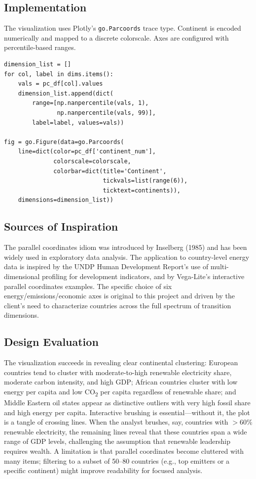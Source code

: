 \documentclass[10pt]{article}
\begin{document}
\subsection{Implementation}

The visualization uses Plotly's \texttt{go.Parcoords} trace type. Continent is encoded numerically and mapped to a discrete colorscale. Axes are configured with percentile-based ranges.

\begin{lstlisting}[caption={Parallel coordinates construction (simplified)},label=lst:parcoords]
dimension_list = []
for col, label in dims.items():
    vals = pc_df[col].values
    dimension_list.append(dict(
        range=[np.nanpercentile(vals, 1),
               np.nanpercentile(vals, 99)],
        label=label, values=vals))

fig = go.Figure(data=go.Parcoords(
    line=dict(color=pc_df['continent_num'],
              colorscale=colorscale,
              colorbar=dict(title='Continent',
                            tickvals=list(range(6)),
                            ticktext=continents)),
    dimensions=dimension_list))
\end{lstlisting}

\subsection{Sources of Inspiration}

The parallel coordinates idiom was introduced by Inselberg (1985) and has been widely used in exploratory data analysis. The application to country-level energy data is inspired by the UNDP Human Development Report's use of multi-dimensional profiling for development indicators, and by Vega-Lite's interactive parallel coordinates examples. The specific choice of six energy/emissions/economic axes is original to this project and driven by the client's need to characterize countries across the full spectrum of transition dimensions.

\subsection{Design Evaluation}

The visualization succeeds in revealing clear continental clustering: European countries tend to cluster with moderate-to-high renewable electricity share, moderate carbon intensity, and high GDP; African countries cluster with low energy per capita and low CO\textsubscript{2} per capita regardless of renewable share; and Middle Eastern oil states appear as distinctive outliers with very high fossil share and high energy per capita. Interactive brushing is essential---without it, the plot is a tangle of crossing lines. When the analyst brushes, say, countries with $>$60\% renewable electricity, the remaining lines reveal that these countries span a wide range of GDP levels, challenging the assumption that renewable leadership requires wealth. A limitation is that parallel coordinates become cluttered with many items; filtering to a subset of 50--80 countries (e.g., top emitters or a specific continent) might improve readability for focused analysis.
\end{document}
